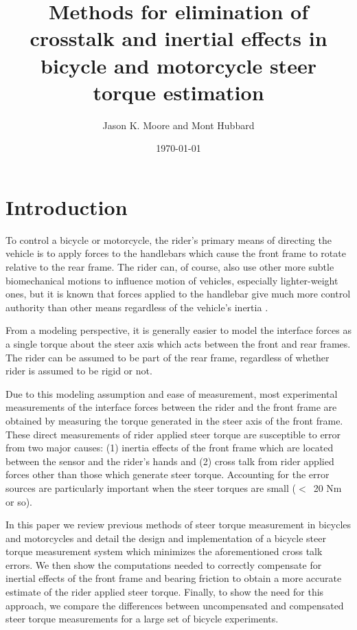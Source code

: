 \documentclass[a4paper]{article}
\title{Methods for elimination of crosstalk and inertial effects in bicycle and motorcycle steer torque estimation}
\author{Jason K. Moore and Mont Hubbard}
\date{\today}
\begin{document}
\maketitle

\section*{Introduction}

To control a bicycle or motorcycle, the rider's primary means of directing the
vehicle is to apply forces to the handlebars which cause the front frame to
rotate relative to the rear frame. The rider can, of course, also use other
more subtle biomechanical motions to influence motion of vehicles, especially
lighter-weight ones, but it is known that forces applied to the handlebar give
much more control authority than other means regardless of the vehicle's
inertia \cite{Sharp2007,Sharp2008a}.

From a modeling perspective, it is generally easier to model the interface
forces as a single torque about the steer axis which acts between the front and
rear frames. The rider can be assumed to be part of the rear frame, regardless
of whether rider is assumed to be rigid or not.

Due to this modeling assumption and ease of measurement, most experimental
measurements of the interface forces between the rider and the front frame are
obtained by measuring the torque generated in the steer axis of the front
frame. These direct measurements of rider applied steer torque are susceptible
to error from two major causes: (1) inertia effects of the front frame which
are located between the sensor and the rider's hands and (2) cross talk from
rider applied forces other than those which generate steer torque. Accounting
for the error sources are particularly important when the steer torques are
small ($<$~20 Nm or so).

In this paper we review previous methods of steer torque measurement in
bicycles and motorcycles and detail the design and implementation of a bicycle
steer torque measurement system which minimizes the aforementioned cross talk
errors. We then show the computations needed to correctly compensate for
inertial effects of the front frame and bearing friction to obtain a more
accurate estimate of the rider applied steer torque. Finally, to show the need
for this approach, we compare the differences between uncompensated and
compensated steer torque measurements for a large set of bicycle experiments.
\end{document}
